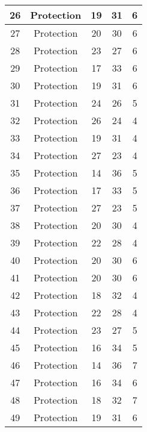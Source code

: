 \documentclass[results.tex]{subfiles}
\begin{document}
\begin{center}
\begin{tabular}{| c || c | c | c | c |}
    \hline
    26 & Protection & 19 & 31 & 6 \\ 
    \hline
    27 & Protection & 20 & 30 & 6 \\ 
    \hline
    28 & Protection & 23 & 27 & 6 \\ 
    \hline
    29 & Protection & 17 & 33 & 6 \\ 
    \hline
    30 & Protection & 19 & 31 & 6 \\ 
    \hline
    31 & Protection & 24 & 26 & 5 \\ 
    \hline
    32 & Protection & 26 & 24 & 4 \\ 
    \hline
    33 & Protection & 19 & 31 & 4 \\ 
    \hline
    34 & Protection & 27 & 23 & 4 \\ 
    \hline
    35 & Protection & 14 & 36 & 5 \\ 
    \hline
    36 & Protection & 17 & 33 & 5 \\ 
    \hline
    37 & Protection & 27 & 23 & 5 \\ 
    \hline
    38 & Protection & 20 & 30 & 4 \\ 
    \hline
    39 & Protection & 22 & 28 & 4 \\ 
    \hline
    40 & Protection & 20 & 30 & 6 \\ 
    \hline
    41 & Protection & 20 & 30 & 6 \\ 
    \hline
    42 & Protection & 18 & 32 & 4 \\ 
    \hline
    43 & Protection & 22 & 28 & 4 \\ 
    \hline
    44 & Protection & 23 & 27 & 5 \\ 
    \hline
    45 & Protection & 16 & 34 & 5 \\ 
    \hline
    46 & Protection & 14 & 36 & 7 \\ 
    \hline
    47 & Protection & 16 & 34 & 6 \\ 
    \hline
    48 & Protection & 18 & 32 & 7 \\ 
    \hline
    49 & Protection & 19 & 31 & 6 \\ 
    \hline   \end{tabular}
\end{center}
\end{document}
